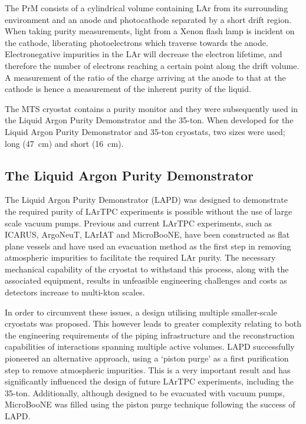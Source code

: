 The PrM consists of a cylindrical volume containing LAr from its surrounding environment and an anode and photocathode separated by a short drift region.  When taking purity measurements, light from a Xenon flash lamp is incident on the cathode, liberating photoelectrons which traverse towards the anode.  Electronegative impurities in the LAr will decrease the electron lifetime, and therefore the number of electrons reaching a certain point along the drift volume.  A measurement of the ratio of the charge arriving at the anode to that at the cathode is hence a measurement of the inherent purity of the liquid.

The MTS cryostat contains a purity monitor and they were subsequently used in the Liquid Argon Purity Demonstrator and the 35-ton.  When developed for the Liquid Argon Purity Demonstrator and 35-ton cryostats, two sizes were used; long (47~cm) and short (16~cm).

\subsection{The Liquid Argon Purity Demonstrator}\label{sec:LAPD}

The Liquid Argon Purity Demonstrator (LAPD) \cite{MTS2011,LAPD2014,LAPDJINST2014} was designed to demonstrate the required purity of LArTPC experiments is possible without the use of large scale vacuum pumps.  Previous and current LArTPC experiments, such as ICARUS, ArgoNeuT, LArIAT and MicroBooNE, have been constructed as flat plane vessels and have used an evacuation method as the first step in removing atmospheric impurities to facilitate the required LAr purity.  The necessary mechanical capability of the cryostat to withstand this process, along with the associated equipment, results in unfeasible engineering challenges and costs as detectors increase to multi-kton scales.

In order to circumvent these issues, a design utilising multiple smaller-scale cryostats was proposed.  This however leads to greater complexity relating to both the engineering requirements of the piping infrastructure and the reconstruction capabilities of interactions spanning multiple active volumes.  LAPD successfully pioneered an alternative approach, using a `piston purge' as a first purification step to remove atmospheric impurities.  This is a very important result and has significantly influenced the design of future LArTPC experiments, including the 35-ton.  Additionally, although designed to be evacuated with vacuum pumps, MicroBooNE was filled using the piston purge technique following the success of LAPD.

